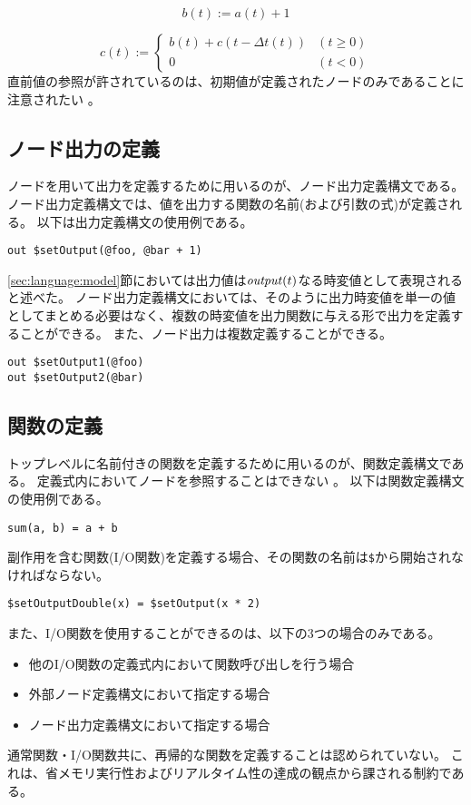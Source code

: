 \begin{equation*}
  b(t) := a(t) + 1
\end{equation*}

\begin{equation*}
  c(t) := \begin{cases}
    b(t) + c(t-\Delta t(t)) & (t \geq 0) \\
    0 & (t < 0)
  \end{cases}
\end{equation*}
直前値の参照が許されているのは、初期値が定義されたノードのみであることに注意されたい \footnotemark[1]。

\subsection{ノード出力の定義}
ノードを用いて出力を定義するために用いるのが、ノード出力定義構文である。
ノード出力定義構文では、値を出力する関数の名前(および引数の式)が定義される。
以下は出力定義構文の使用例である。
\begin{lstlisting}[basicstyle=\ttfamily\small,language=SFRP]
out $setOutput(@foo, @bar + 1)
\end{lstlisting}
\ref{sec:language:model}節においては出力値は${\it output}(t)$なる時変値として表現されると述べた。
ノード出力定義構文においては、そのように出力時変値を単一の値としてまとめる必要はなく、複数の時変値を出力関数に与える形で出力を定義することができる。
また、ノード出力は複数定義することができる。
\begin{lstlisting}[basicstyle=\ttfamily\small,language=SFRP]
out $setOutput1(@foo)
out $setOutput2(@bar)
\end{lstlisting}

\subsection{関数の定義}
トップレベルに名前付きの関数を定義するために用いるのが、関数定義構文である。
定義式内においてノードを参照することはできない \footnotemark[1]。
以下は関数定義構文の使用例である。
\begin{lstlisting}[basicstyle=\ttfamily\small,language=SFRP]
sum(a, b) = a + b
\end{lstlisting}
副作用を含む関数(I/O関数)を定義する場合、その関数の名前は\texttt{\$}から開始されなければならない。
\begin{lstlisting}[basicstyle=\ttfamily\small,language=SFRP]
$setOutputDouble(x) = $setOutput(x * 2)
\end{lstlisting}
また、I/O関数を使用することができるのは、以下の3つの場合のみである。
\begin{itemize}
  \item 他のI/O関数の定義式内において関数呼び出しを行う場合
  \item 外部ノード定義構文において指定する場合
  \item ノード出力定義構文において指定する場合
\end{itemize}
通常関数・I/O関数共に、再帰的な関数を定義することは認められていない。
これは、省メモリ実行性およびリアルタイム性の達成の観点から課される制約である。


